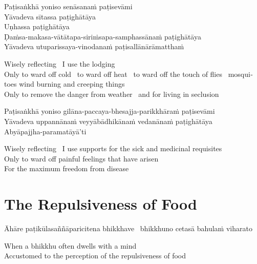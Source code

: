 Paṭisaṅkhā yoniso senāsanaṁ paṭisevāmi\\
Yāvadeva sītassa paṭighātāya\\
Uṇhassa paṭighātāya\\
Ḍaṁsa-makasa-vātātapa-siriṁsapa-samphassānaṁ paṭighātāya\\
Yāvadeva utuparissaya-vinodanaṁ paṭisallānārāmatthaṁ

\begin{english}
  Wisely reflecting \breathmark\ I use the lodging\\
  Only to ward off cold \breathmark\ to ward off heat \breathmark\ to ward off the touch of flies \breathmark\ mosquitoes wind burning and creeping things\\
  Only to remove the danger from weather \breathmark\ and for living in seclusion
\end{english}

Paṭisaṅkhā yoniso gilāna-paccaya-bhesajja-parikkhāraṁ paṭisevāmi\\
Yāvadeva uppannānaṁ veyyābādhikānaṁ vedanānaṁ paṭighātāya\\
Abyāpajjha-paramatāyā’ti

\begin{english}
  Wisely reflecting \breathmark\ I use supports for the sick and medicinal requisites\\
  Only to ward off painful feelings that have arisen\\
  For the maximum freedom from disease
\end{english}

\suttaRef{[MN 2]}


\section{The Repulsiveness of Food}
\label{repulsiveness-of-food}

\begin{leader}
\end{leader}

Āhāre paṭikūlasaññāparicitena bhikkhave \breathmark\ bhikkhuno cetasā bahulaṁ viharato

\begin{english}
  When a bhikkhu often dwells with a mind\\
  Accustomed to the perception of the repulsiveness of food
\end{english}

